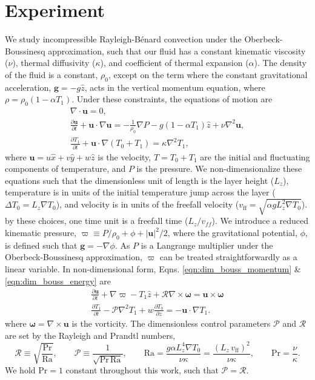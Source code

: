 \documentclass[aps, pre, onecolumn, nofootinbib, notitlepage, groupedaddress, amsfonts, amssymb, amsmath, longbibliography]{revtex4-1}
\newcommand{\DivU}{\ensuremath{\nabla\cdot\bm{u}}}
\newcommand{\grad}{\ensuremath{\nabla}}
\newcommand{\RB}{Rayleigh-B\'{e}nard }
\begin{document}
\section{Experiment}
\label{sec:experiment}
We study incompressible \RB convection under the Oberbeck-Boussinesq approximation,
such that our fluid
has a constant kinematic viscosity ($\nu$), thermal diffusivity ($\kappa$), and coefficient
of thermal expansion ($\alpha$). The density of the fluid is a constant, $\rho_0$, except on the
term where the constant gravitational acceleration, $\bm{g} = - g\hat{z}$, acts in the vertical momentum equation, 
where $\rho = \rho_0(1  - \alpha T_1)$.  
Under these constraints, the equations of motion are \cite{spiegel&veronis1960}
\begin{gather}
\DivU = 0, 
	\label{eqn:incompressible}
\\
\frac{\partial \bm{u}}{\partial t} + \bm{u}\cdot\grad\bm{u} =
-\frac{1}{\rho_0}\grad P - g( 1 - \alpha T_1)\hat{z} + \nu\grad^2\bm{u}, 
	\label{eqn:dim_bouss_momentum}
\\
\frac{\partial T_1}{\partial t} + \bm{u}\cdot\grad(T_0 + T_1) = \kappa\grad^2 T_1,
	\label{eqn:dim_bouss_energy}
\end{gather}
where $\bm{u} = u\hat{x} + v\hat{y} + w\hat{z}$ is the velocity, 
$T = T_0 + T_1$ are the initial and fluctuating components of temperature, 
and $P$ is the pressure.
We non-dimensionalize these equations such that the dimensionless unit of
length is the layer height ($L_z$),
temperature is in units of the initial temperature jump across the layer ($\Delta T_0 = L_z \grad T_0$), 
and velocity is in units of the freefall velocity ($v_{\text{ff}} = \sqrt{\alpha g L_z^2 \grad T_0}$).
by these choices, one time unit is a freefall time ($L_z/v_{ff}$).
We introduce a reduced kinematic pressure,
$\varpi \equiv P / \rho_0 + \phi + |\bm{u}|^2 / 2$, where the gravitational
potential, $\phi$, is defined such that $\bm{g} = -\grad \phi$. As $P$ is a
Langrange multiplier under the Oberbeck-Boussinesq approximation, $\varpi$
can be treated straightforwardly as a linear variable. 
In non-dimensional form, Eqns. \ref{eqn:dim_bouss_momentum} \& \ref{eqn:dim_bouss_energy}
are
\begin{gather}
\frac{\partial \bm{u}}{\partial t} + \grad \varpi - T_1\hat{z} + \mathcal{R}\grad\times\bm{\omega} = \bm{u}\times\bm{\omega}
	\label{eqn:bouss_momentum}
\\
\frac{\partial T_1}{\partial t} - \mathcal{P}\grad^2 T_1 + w \frac{\partial T_0}{\partial z} = - \bm{u}\cdot\grad T_1.
	\label{eqn:bouss_energy}
\end{gather}
where $\bm{\omega} = \grad \times \bm{u}$ is the vorticity.
The dimensionless control parameters $\mathcal{P}$ and $\mathcal{R}$ 
are set by the Rayleigh and Prandtl numbers,
\begin{equation}
\mathcal{R} \equiv \sqrt{\frac{\text{Pr}}{\text{Ra}}}, \qquad \mathcal{P} \equiv \frac{1}{\sqrt{\text{Pr}\,\text{Ra}}}, \qquad
\text{Ra} = \frac{g \alpha L_z^4 \grad T_0}{\nu\kappa} = \frac{(L_z\,v_{\text{ff}})^2}{\nu\kappa}, \qquad \text{Pr} = \frac{\nu}{\kappa}.
\end{equation}
We hold Pr$ = 1$ constant throughout this work, such that $\mathcal{P} = \mathcal{R}$.
\end{document}
